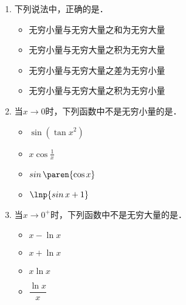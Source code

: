 \documentclass[a4paper,punct=CCT]{ctexbook}
\theoremstyle{definition}
\theoremstyle{remark}
\newif\ifshowsol
\let\geq\geqslant
\let\ge\geq}
\begin{document}
\begin{enumerate}
\item 下列说法中，正确的是\uline{\makebox[6em]{}}．
  \begin{itemize}
    \renewcommand{\labelitemi}{\faCircleThin}
    \ifshowsol
  \item[\faCircle]
    \else
  \item
    \fi
    无穷小量与无穷大量之和为无穷大量
  \item 无穷小量与无穷大量之积为无穷大量
  \item 无穷小量与无穷大量之差为无穷小量
  \item 无穷小量与无穷大量之积为无穷小量
  \end{itemize}

  \ifshowsol
  令\(f(x) = \sin x,\ g(x) = \frac1x\)，则在原点处\(f\)和\(g\)分别是无穷小量和无穷大量．但是\(f \cdot g\)即不是无穷小量，也不是无穷大量．所以选项~B和~D都错了．设\(f\)和\(g\)在点\(a\)处分别是无穷小量和无穷大量．对于任意的\(M > 0\)都存在一个去心邻域使得当\(x\)在此邻域上时都有
  \begin{gather*}
    \abs*{\,f(x)} < M
    \txt{且}
    2\,M < \abs*{g(x)} \\
    \shortintertext{即}
    \abs*{\,f(x) \pm g(x)}
    \ge \abs[\Big]{\abs*{g(x)} - \abs*{\,f(x)}}
    \ge \abs*{g(x)} - \abs*{\,f(x)}
    > M.
  \end{gather*}
  所以选项~A对了而选项~C错了．
  \fi

\item 当\(x \to 0\)时，下列函数中不是无穷小量的是\uline{\makebox[6em]{}}．
  \begin{itemize}
    \renewcommand{\labelitemi}{\faCircleThin}
  \item \(\sin(\tan x^2)\)
  \item \(x \cos\frac1x\)
    \ifshowsol
  \item[\faCircle]
    \else
  \item
    \fi
    \(\sin\paren{\cos x}\)
  \item \(\lnp{\sin x + 1}\)
  \end{itemize}

\item 当\(x \to 0^+\)时，下列函数中不是无穷大量的是\uline{\makebox[6em]{}}．
  \begin{itemize}
    \renewcommand{\labelitemi}{\faCircleThin}
  \item \(x - \ln x\)
  \item \(x + \ln x\)
    \ifshowsol
  \item[\faCircle]
    \else
  \item
    \fi
    \(x \ln x\)
  \item \(\dfrac{\ln x}{x}\)\rule{0ex}{3.5ex}
  \end{itemize}


\end{enumerate}
\end{document}
